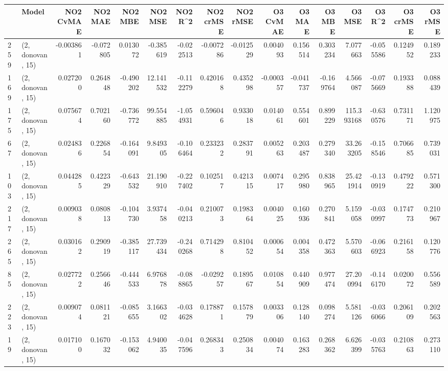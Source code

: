 \begin{tabular}{llrrrrrrrrrrrrrr}
\toprule
{} &             Model &  NO2 CvMAE &   NO2 MAE &   NO2 MBE &     NO2 MSE &   NO2 R\textasciicircum2 &  NO2 crMSE &  NO2 rMSE &  O3 CvMAE &    O3 MAE &    O3 MBE &      O3 MSE &    O3 R\textasciicircum2 &  O3 crMSE &   O3 rMSE \\
\midrule
259 &  (2, donovan, 15) &  -0.003861 & -0.072805 &  0.013072 &   -0.385619 & -0.022513 &  -0.007286 & -0.012529 &  0.004093 &  0.156514 &  0.303234 &    7.077663 & -0.055586 &  0.124952 &  0.189233 \\
169 &  (2, donovan, 15) &   0.027200 &  0.264848 & -0.490202 &   12.141532 & -0.112279 &   0.420168 &  0.435298 & -0.000357 & -0.041737 & -0.169764 &    4.566087 & -0.075669 &  0.193388 &  0.088439 \\
175 &  (2, donovan, 15) &   0.075674 &  0.702160 & -0.736772 &   99.554885 & -1.054931 &   0.596046 &  0.933018 &  0.014061 &  0.554601 &  0.899229 &  115.393168 & -0.630576 &  0.731171 &  1.120975 \\
67  &  (2, donovan, 15) &   0.024836 &  0.226854 & -0.164091 &    9.849305 & -0.106464 &   0.233232 &  0.283791 &  0.005263 &  0.203487 &  0.279340 &   33.263205 & -0.158546 &  0.706685 &  0.739031 \\
103 &  (2, donovan, 15) &   0.044285 &  0.422329 & -0.643532 &   21.190910 & -0.227402 &   0.102517 &  0.421315 &  0.007417 &  0.295980 &  0.838965 &   25.421914 & -0.130919 &  0.479222 &  0.571300 \\
217 &  (2, donovan, 15) &   0.009038 &  0.080813 & -0.104730 &    3.937458 & -0.040213 &   0.210073 &  0.198364 &  0.004025 &  0.160936 &  0.270841 &    5.159058 & -0.030997 &  0.174773 &  0.210967 \\
265 &  (2, donovan, 15) &   0.030162 &  0.290919 & -0.385117 &   27.739434 & -0.240268 &   0.714298 &  0.810452 &  0.000654 &  0.004358 &  0.472363 &    5.570603 & -0.066923 &  0.216158 &  0.120776 \\
85  &  (2, donovan, 15) &   0.027722 &  0.256646 & -0.444533 &    6.976878 & -0.088865 &  -0.029257 &  0.189567 &  0.010854 &  0.440909 &  0.977474 &   27.200994 & -0.146170 &  0.020072 &  0.556589 \\
223 &  (2, donovan, 15) &   0.009074 &  0.081121 & -0.085655 &    3.166302 & -0.034628 &   0.178871 &  0.157879 &  0.003306 &  0.128140 &  0.098274 &    5.581126 & -0.036066 &  0.206109 &  0.202563 \\
19  &  (2, donovan, 15) &   0.017100 &  0.167032 & -0.153062 &    4.940035 & -0.047596 &   0.268343 &  0.250834 &  0.004074 &  0.163283 &  0.268362 &    6.626399 & -0.035763 &  0.210863 &  0.273110 \\

\end{tabular}
